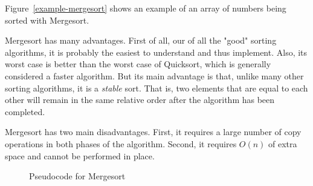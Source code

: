 \documentclass{article}
\begin{document}
Figure~\ref{example-mergesort} shows an example of an array of numbers being sorted with Mergesort.

Mergesort has many advantages. First of all, our of all the "good" sorting algorithms, it is probably
the easiest to understand and thus implement. Also, its worst case is better than the worst
case of Quicksort, which is generally considered a faster algorithm. But its main advantage is that,
unlike many other sorting algorithms, it is a \textit{stable} sort. That is, two elements that are equal 
to each other will remain in the same relative order after the algorithm has been completed. 

Mergesort has two main disadvantages. First, it requires a large number of copy operations in both
phases of the algorithm. Second, it requires $O(n)$ of extra space and cannot be performed 
in place.

\begin{figure}
\caption{Pseudocode for Mergesort}
\label{pseudo-mergesort}
\end{figure}
	
\end{document}
